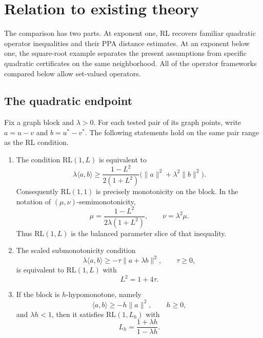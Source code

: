 \section{Relation to existing theory}
\label{sec:comparison}

The comparison has two parts.  At exponent one, RL recovers familiar
quadratic operator inequalities and their PPA distance estimates.  At an
exponent below one, the square-root example separates the present assumptions
from specific quadratic certificates on the same neighborhood.  All of the
operator frameworks compared below allow set-valued operators.

\subsection{The quadratic endpoint}

\begin{proposition}
\label{prop:linear-identifications}
Fix a graph block and $\lambda>0$.  For each tested pair of its graph points,
write $a=u-v$ and $b=u^*-v^*$.  The following statements hold on the same
pair range as the RL condition.
\begin{enumerate}
\item The condition $\mathrm{RL}(1,L)$ is equivalent to
\begin{equation}
 \lambda\langle a,b\rangle
 \ge \frac{1-L^2}{2(1+L^2)}
       \bigl(\|a\|^2+\lambda^2\|b\|^2\bigr).
 \label{eq:linear-rl-balanced}
\end{equation}
Consequently $\mathrm{RL}(1,1)$ is precisely monotonicity on the block.
In the notation of $(\mu,\nu)$-semimonotonicity,
\begin{equation}
 \mu=\frac{1-L^2}{2\lambda(1+L^2)},
 \qquad \nu=\lambda^2\mu.
 \label{eq:balanced-slice-parameters}
\end{equation}
Thus $\mathrm{RL}(1,L)$ is the balanced parameter slice of that inequality.

\item The scaled submonotonicity condition
\[
 \lambda\langle a,b\rangle
 \ge-\tau\|a+\lambda b\|^2,\qquad \tau\ge0,
\]
is equivalent to $\mathrm{RL}(1,L)$ with
\begin{equation}
 L^2=1+4\tau.
 \label{eq:luke-tam-normalization}
\end{equation}

\item If the block is $h$-hypomonotone, namely
\[
 \langle a,b\rangle\ge-h\|a\|^2,
 \qquad h\ge0,
\]
and $\lambda h<1$, then it satisfies $\mathrm{RL}(1,L_h)$ with
\begin{equation}
 L_h=\frac{1+\lambda h}{1-\lambda h}.
 \label{eq:hypo-to-rl}
\end{equation}
\end{enumerate}
\end{proposition}

